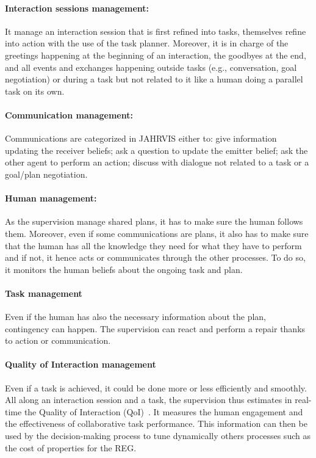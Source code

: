 \paragraph{Interaction sessions management:} It manage an interaction session that is first refined into tasks, themselves refine into action with the use of the task planner. Moreover, it is in charge of the greetings happening at the beginning of an interaction, the goodbyes at the end, and all events and exchanges happening outside tasks (e.g., conversation, goal negotiation) or during a task but not related to it like a human doing a parallel task on its own.

\paragraph{Communication management:} Communications are categorized in JAHRVIS either to: give information updating the receiver beliefs; ask a question to update the emitter belief; ask the other agent to perform an action; discuss with dialogue not related to a task or a goal/plan negotiation. 

\paragraph{Human management:} As the supervision manage shared plans, it has to make sure the human follows them. Moreover, even if some communications are plans, it also has to make sure that the human has all the knowledge they need for what they have to perform and if not, it hence acts or communicates through the other processes. To do so, it monitors the human beliefs about the ongoing task and plan.

\paragraph{Task management} Even if the human has also the necessary information about the plan, contingency can happen. The supervision can react and perform a repair thanks to action or communication.

\paragraph{Quality of Interaction management} Even if a task is achieved, it could be done more or less efficiently and smoothly. All along an interaction session and a task, the supervision thus estimates in real-time the Quality of Interaction (QoI)~\cite{mayima_2020_toward}. It measures the human engagement and the effectiveness of collaborative task performance. This information can then be used by the decision-making process to tune dynamically others processes such as the cost of properties for the REG.


